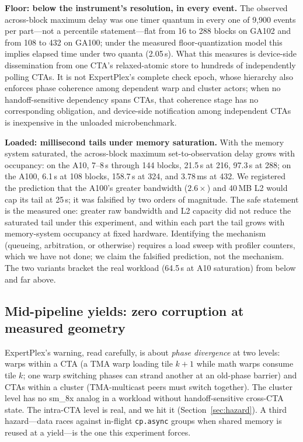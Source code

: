 \documentclass[11pt]{article}
\newcommand{\us}{\,\textmu s\xspace}
\begin{document}
\textbf{Floor: below the instrument's resolution, in every event.}
The observed across-block maximum delay was one timer quantum in
every one of 9{,}900 events per part---not a percentile
statement---flat from 16 to 288 blocks on GA102 and from 108 to 432
on GA100; under the measured floor-quantization model this implies
elapsed time under two quanta (2.05\us). What this measures is
device-side dissemination from one CTA's relaxed-atomic store to
hundreds of independently polling CTAs. It is not ExpertPlex's
complete check epoch, whose hierarchy also enforces phase coherence
among dependent warp and cluster actors; when no handoff-sensitive
dependency spans CTAs, that coherence stage has no corresponding
obligation, and device-side notification among independent CTAs is
inexpensive in the unloaded microbenchmark.

\textbf{Loaded: millisecond tails under memory saturation.} With the
memory system saturated, the across-block maximum set-to-observation
delay grows with occupancy: on the A10, 7--8\us{} through 144 blocks,
21.5\us{} at 216, 97.3\us{} at 288; on the A100, 6.1\us{} at 108
blocks, 158.7\us{} at 324, and 3.78\,ms at 432. We registered the
prediction that the A100's greater bandwidth ($2.6\times$) and
40\,MB L2 would cap its tail at 25\us; it was falsified by two orders
of magnitude. The safe statement is the measured one: greater raw
bandwidth and L2 capacity did not reduce the saturated tail under
this experiment, and within each part the tail grows with
memory-system occupancy at fixed hardware. Identifying the mechanism
(queueing, arbitration, or otherwise) requires a load sweep with
profiler counters, which we have not done; we claim the falsified
prediction, not the mechanism. The two variants bracket the real
workload (64.5\us{} at A10 saturation) from below and far above.

\subsection{Mid-pipeline yields: zero corruption at measured
geometry}
\label{sec:safety}

ExpertPlex's warning, read carefully, is about \emph{phase
divergence} at two levels: warps within a CTA (a TMA warp loading
tile $k{+}1$ while math warps consume tile $k$; one warp switching
phases can strand another at an old-phase barrier) and CTAs within a
cluster (TMA-multicast peers must switch together). The cluster level
has no sm\_8x analog in a workload without handoff-sensitive
cross-CTA state. The intra-CTA level is real, and we hit it
(Section~\ref{sec:hazard}). A third hazard---data races against
in-flight \texttt{cp.async} groups when shared memory is reused at a
yield---is the one this experiment forces.
\end{document}
